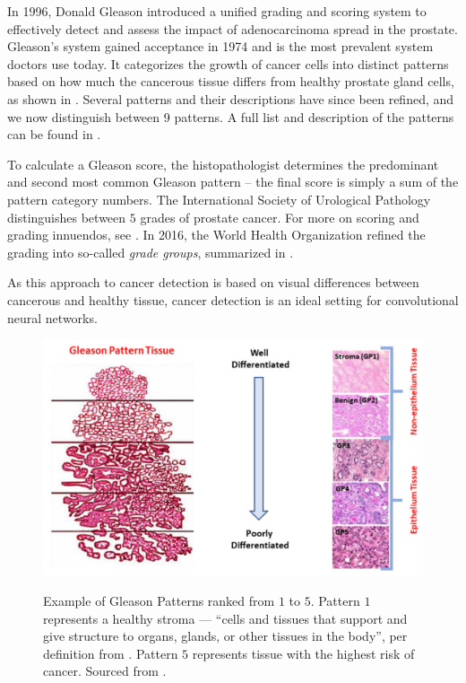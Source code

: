 In 1996, Donald Gleason introduced a unified grading and scoring system to effectively detect and assess the impact of adenocarcinoma spread in the prostate.
Gleason's system gained acceptance in 1974 and is the most prevalent system doctors use today.
It categorizes the growth of cancer cells into distinct patterns based on how much the cancerous tissue differs from healthy prostate gland cells, as shown in .
Several patterns and their descriptions have since been refined, and we now distinguish between 9 patterns.
A full list and description of the patterns can be found in \cite{gleason-patterns}.

To calculate a Gleason score, the histopathologist determines the predominant and second most common Gleason pattern -- the final score is simply a sum of the pattern category numbers.
The International Society of Urological Pathology distinguishes between $5$ grades of prostate cancer.
For more on scoring and grading innuendos, see \cite{gleason-pattern-grading}.
In 2016, the World Health Organization refined the grading into so-called \emph{grade groups}, summarized in \cite{who-grade-groups}.

As this approach to cancer detection is based on visual differences between cancerous and healthy tissue, cancer detection is an ideal setting for convolutional neural networks.

\begin{figure}
    \begin{center}
    \begin{minipage}{1\textwidth}
      {\includegraphics[width=\textwidth]{img/gp-classification.png}}
    \end{minipage}
    \caption{Example of Gleason Patterns ranked from $1$ to $5$. Pattern $1$ represents a healthy stroma --- ``cells and tissues that support and give structure to organs, glands, or other tissues in the body'', per definition from \cite{nci-stroma}. Pattern $5$ represents tissue with the highest risk of cancer. Sourced from \cite{gleason-pattern-description}.}
    \label{fig:gp}
    \end{center}
\end{figure}

